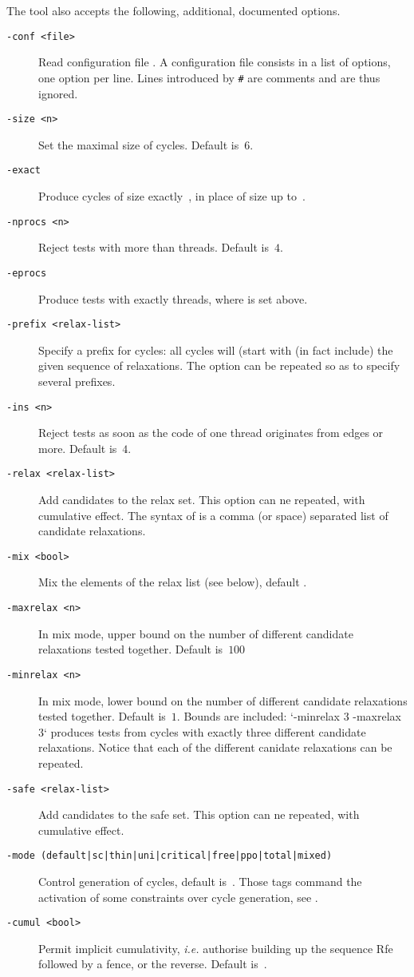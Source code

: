 The tool \diy{} also accepts the following, additional, documented options.
\begin{description}
\item[{\tt -conf <file>}] Read configuration file .
A configuration file consists in a list of options, one option per line.
Lines introduced by \verb+#+ are comments and are thus ignored.
\item[{\tt -size <n>}] Set the maximal size of cycles. Default is~$6$.
\item[{\tt -exact}] Produce cycles of size exactly~,
in place of size up to~.
\item[{\tt -nprocs <n>}] Reject tests with more than  threads.
Default is~$4$.
\item[{\tt -eprocs}] Produce tests with exactly 
threads, where  is set above.
\item[{\tt -prefix <relax-list>}] Specify a prefix for cycles: all cycles will (start with (in fact include) the given sequence of relaxations. The option can be repeated so as to specify several prefixes.
\item[{\tt -ins <n>}] Reject tests as soon as the code of one thread
originates from  edges or more. Default is~$4$.
\item[{\tt -relax <relax-list>}] Add candidates to the relax set.  This option can ne repeated, with cumulative effect.
The syntax of  is a comma (or space)
separated list of candidate relaxations.
\item[{\tt -mix <bool>}] Mix the elements of the relax list
(see below), default .
\item[{\tt -maxrelax <n>}]
In mix mode, upper bound on the number of different candidate
relaxations tested together.
Default is~$100$
\item[{\tt -minrelax <n>}]
In mix mode, lower bound on the number of different candidate
relaxations tested together.
Default is~$1$. Bounds are included: `-minrelax 3 -maxrelax 3` produces tests from cycles with exactly three different candidate relaxations. Notice that each of the different canidate relaxations can be repeated.
\item[{\tt -safe <relax-list>}] Add candidates to the safe set. This option can ne repeated, with cumulative effect.
\item[{\tt -mode (default|sc|thin|uni|critical|free|ppo|total|mixed)}]
Control generation  of cycles, default is~.
Those tags command the activation of some constraints over cycle
generation, see .
\item[{\tt -cumul <bool>}]
Permit implicit cumulativity,
\emph{i.e.} authorise building up the sequence Rfe followed by a fence,
or the reverse. Default is~.
\end{description}
